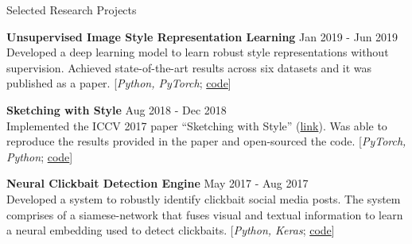 \documentclass{resume} %
\begin{document}
\begin{rSection}{Selected Research Projects}
\item \textbf{Unsupervised Image Style Representation Learning} \hfill Jan 2019 - Jun 2019\\
Developed a deep learning model to learn robust style representations without supervision. Achieved state-of-the-art results across six datasets and it was published as a paper. [\textit{Python, PyTorch}; \href{https://github.com/sidgairo18/unsupervised-style-learning}{code}] %

\item \textbf{Sketching with Style} \hfill Aug 2018 - Dec 2018\\
Implemented the ICCV 2017 paper ``Sketching with Style'' (\href{https://openaccess.thecvf.com/content_iccv_2017/html/Collomosse_Sketching_With_Style_ICCV_2017_paper.html}{link}). Was able to reproduce the results provided in the paper and open-sourced the code.
[\textit{PyTorch, Python}; \href{https://github.com/sidgairo18/Sketching-with-Style-ICCV-2017-PyTorch-}{code}]  %



\item \textbf{Neural Clickbait Detection Engine} \hfill May 2017 - Aug 2017\\
Developed a system to robustly identify clickbait social media posts. The system comprises of a siamese-network that fuses visual and textual information to learn a neural embedding used to detect clickbaits. [\textit{Python, Keras}; \href{https://github.com/vaibhav4595/Clickbait_Detection}{code}] %


\end{rSection}
\end{document}
